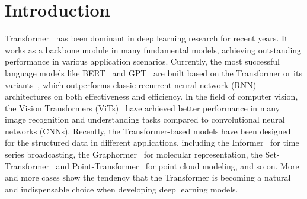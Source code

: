 \section{Introduction}\label{sec:intro}
Transformer~\cite{vaswani2017attention} has been dominant in deep learning research for recent years. 
It works as a backbone module in many fundamental models, achieving outstanding performance in various application scenarios. 
Currently, the most successful language models like BERT~\cite{devlin2019bert} and GPT~\cite{brown2020language} are built based on the Transformer or its variants~\cite{child2019generating,dai2019transformer}, which outperforms classic recurrent neural network (RNN) architectures on both effectiveness and efficiency. 
In the field of computer vision, the Vision Transformers (ViTs)~\cite{dosovitskiy2021an,liu2021swin,arnab2021vivit} have achieved better performance in many image recognition and understanding tasks compared to convolutional neural networks (CNNs).
Recently, the Transformer-based models have been designed for the structured data in different applications, including the Informer~\cite{zhang2021informer} for time series broadcasting, the Graphormer~\cite{ying2021transformers} for molecular representation, the Set-Transformer~\cite{lee2019set} and Point-Transformer~\cite{zhao2021point} for point cloud modeling, and so on.
More and more cases show the tendency that the Transformer is becoming a natural and indispensable choice when developing deep learning models.

